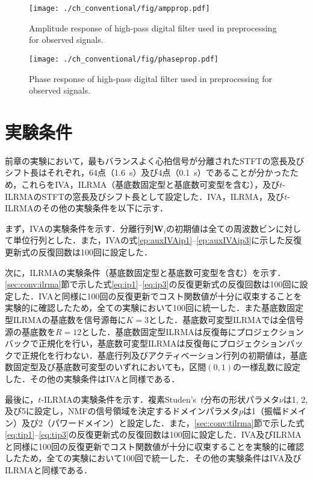 \begin{figure}[!t]
\centering
\texttt{[image: ./ch\_conventional/fig/ampprop.pdf]}
\caption{Amplitude response of high-pass digital filter used in preprocessing for observed signals.}
\label{fig:ampres}
\end{figure}

\begin{figure}[!t]
\centering
\texttt{[image: ./ch\_conventional/fig/phaseprop.pdf]}
\caption{Phase response of high-pass digital filter used in preprocessing for observed signals.}
\label{fig:phaseres}
\end{figure}

\section{実験条件}
\label{sec:conv:expcond5}

前章の実験において，最もバランスよく心拍信号が分離されたSTFTの窓長及びシフト長はそれぞれ，64点（1.6~s）及び4点（0.1~s）であることが分かったため，これらをIVA，ILRMA（基底数固定型と基底数可変型を含む），及び$t$-ILRMAのSTFTの窓長及びシフト長として設定した．IVA，ILRMA，及び$t$-ILRMAのその他の実験条件を以下に示す．

まず，IVAの実験条件を示す．分離行列$\bm{W}_{i}$の初期値は全ての周波数ビンに対して単位行列とした．また，IVAの式\eqref{ep:auxIVAip1}--\eqref{ep:auxIVAip3}に示した反復更新式の反復回数は100回に設定した．

次に，ILRMAの実験条件（基底数固定型と基底数可変型を含む）を示す．\ref{sec:conv:ilrma}節で示した式\eqref{eq:ip1}--\eqref{eq:ip3}の反復更新式の反復回数は100回に設定した．IVAと同様に100回の反復更新でコスト関数値が十分に収束することを実験的に確認したため，全ての実験において100回に統一した．また基底数固定型ILRMAの基底数を信号源毎に$K=3$とした．基底数可変型ILRMAでは全信号源の基底数を$R=12$とした．基底数固定型ILRMAは反復毎にプロジェクションバックで正規化を行い，基底数可変型ILRMAは反復毎にプロジェクションバックで正規化を行わない．基底行列及びアクティベーション行列の初期値は，基底数固定型及び基底数可変型のいずれにおいても，区間$(0,1)$の一様乱数に設定した．その他の実験条件はIVAと同様である．

最後に，$t$-ILRMAの実験条件を示す．複素Studen's~$t$分布の形状パラメタ$\nu$は1, 2, 及び5に設定し，NMFの信号領域を決定するドメインパラメタ$p$は1（振幅ドメイン）及び2（パワードメイン）と設定した．また，\ref{sec:conv:tilrma}節で示した式\eqref{eq:tip1}--\eqref{eq:tip3}の反復更新式の反復回数は100回に設定した．IVA及びILRMAと同様に100回の反復更新でコスト関数値が十分に収束することを実験的に確認したため，全ての実験において100回で統一した．その他の実験条件はIVA及びILRMAと同様である．


